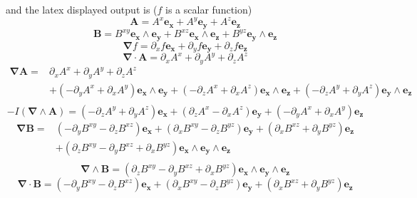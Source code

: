 \documentclass[12pt,twoside,openright]{memoir}
\newcommand{\bm}[1]{\boldsymbol{#1}}
\newcommand{\W}{\wedge}
\begin{document}
and the latex displayed output is ($f$ is a scalar function)
\begin{equation*} \bm{A} = A^{x}\bm{e_{x}}+A^{y}\bm{e_{y}}+A^{z}\bm{e_{z}} \end{equation*}
\begin{equation*} \bm{B} = B^{xy}\bm{e_{x}\W e_{y}}+B^{xz}\bm{e_{x}\W e_{z}}+B^{yz}\bm{e_{y}\W e_{z}} \end{equation*}
\begin{equation*} \bm{\nabla}  f = \partial_{x} f\bm{e_{x}}+\partial_{y} f\bm{e_{y}}+\partial_{z} f\bm{e_{z}} \end{equation*}
\begin{equation*} \bm{\nabla} \cdot \bm{A} = \partial_{x} A^{x} + \partial_{y} A^{y} + \partial_{z} A^{z} \end{equation*}
 \begin{align*} \bm{\nabla}  \bm{A} =  & \partial_{x} A^{x} + \partial_{y} A^{y} + \partial_{z} A^{z} \\  & +\left ( - \partial_{y} A^{x} + \partial_{x} A^{y}\right ) \bm{e_{x}\W e_{y}}+\left ( - \partial_{z} A^{x} + \partial_{x} A^{z}\right ) \bm{e_{x}\W e_{z}}+\left ( - \partial_{z} A^{y} + \partial_{y} A^{z}\right ) \bm{e_{y}\W e_{z}} \\ \end{align*} 
\begin{equation*} -I (\bm{\nabla} \W \bm{A}) = \left ( - \partial_{z} A^{y} + \partial_{y} A^{z}\right ) \bm{e_{x}}+\left ( \partial_{z} A^{x} - \partial_{x} A^{z}\right ) \bm{e_{y}}+\left ( - \partial_{y} A^{x} + \partial_{x} A^{y}\right ) \bm{e_{z}} \end{equation*}
 \begin{align*} \bm{\nabla}  \bm{B} =  & \left ( - \partial_{y} B^{xy} - \partial_{z} B^{xz}\right ) \bm{e_{x}}+\left ( \partial_{x} B^{xy} - \partial_{z} B^{yz}\right ) \bm{e_{y}}+\left ( \partial_{x} B^{xz} + \partial_{y} B^{yz}\right ) \bm{e_{z}} \\  & +\left ( \partial_{z} B^{xy} - \partial_{y} B^{xz} + \partial_{x} B^{yz}\right ) \bm{e_{x}\W e_{y}\W e_{z}} \\ \end{align*} 
\begin{equation*} \bm{\nabla} \W \bm{B} = \left ( \partial_{z} B^{xy} - \partial_{y} B^{xz} + \partial_{x} B^{yz}\right ) \bm{e_{x}\W e_{y}\W e_{z}} \end{equation*}
\begin{equation*} \bm{\nabla} \cdot \bm{B} = \left ( - \partial_{y} B^{xy} - \partial_{z} B^{xz}\right ) \bm{e_{x}}+\left ( \partial_{x} B^{xy} - \partial_{z} B^{yz}\right ) \bm{e_{y}}+\left ( \partial_{x} B^{xz} + \partial_{y} B^{yz}\right ) \bm{e_{z}} \end{equation*}
\end{document}
